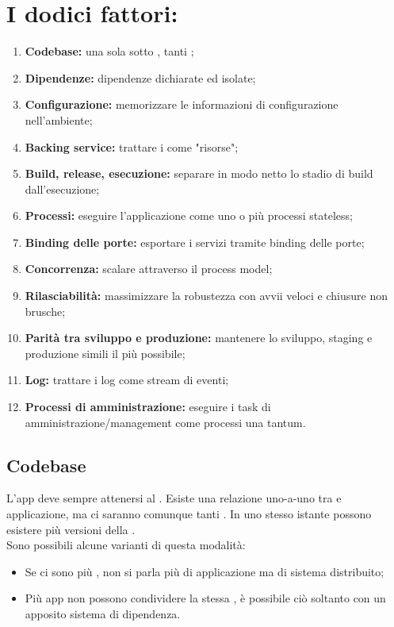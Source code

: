 \documentclass[PianoDiQualifica.tex]{subfiles}
\begin{document}
\section{I dodici fattori:}
\begin{enumerate}
\item \textbf{Codebase:} una sola  sotto , tanti ;
\item \textbf{Dipendenze:} dipendenze dichiarate ed isolate;
\item \textbf{Configurazione:} memorizzare le informazioni di configurazione nell'ambiente;
\item \textbf{Backing service:} trattare i  come "risorse";
\item \textbf{Build, release, esecuzione:} separare in modo netto lo stadio di build dall'esecuzione;
\item \textbf{Processi:} eseguire l'applicazione come uno o più processi stateless;
\item \textbf{Binding delle porte:} esportare i servizi tramite binding delle porte;
\item \textbf{Concorrenza:} scalare attraverso il process model;
\item \textbf{Rilasciabilità:} massimizzare la robustezza con avvii veloci e chiusure non brusche;
\item \textbf{Parità tra sviluppo e produzione:} mantenere lo sviluppo, staging e produzione simili il più possibile;
\item \textbf{Log:} trattare i log come stream di eventi;
\item \textbf{Processi di amministrazione:} eseguire i task di amministrazione/management come processi una tantum.
\end{enumerate}

\subsection{Codebase}
L'app deve sempre attenersi al . Esiste una relazione uno-a-uno tra  e applicazione, ma ci saranno comunque tanti . In uno stesso istante possono esistere più versioni della .\\
Sono possibili alcune varianti di questa modalità:
\begin{itemize}
\item Se ci sono più , non si parla più di applicazione ma di sistema distribuito;
\item Più app non possono condividere la stessa , è possibile ciò soltanto con un apposito sistema di dipendenza.
\end{itemize}
\end{document}
